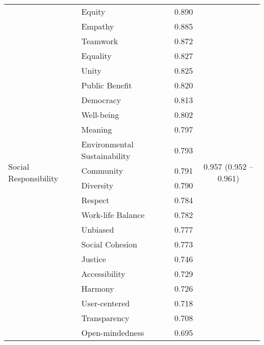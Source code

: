 \begin{longtable}{llcc}
        \multirow{43}{*}{Social Responsibility}
                                  & Equity                  & 0.890 & \multirow{43}{*}{0.957 (0.952 -- 0.961)} \\
                                  & Empathy                 & 0.885 & \\
                                  & Teamwork                & 0.872 & \\
                                  & Equality                & 0.827 & \\
                                  & Unity                   & 0.825 & \\
                                  & Public Benefit          & 0.820 & \\
                                  & Democracy               & 0.813 & \\
                                  & Well-being              & 0.802 & \\
                                  & Meaning                 & 0.797 & \\
                                  & Environmental Sustainability & 0.793 & \\
                                  & Community               & 0.791 & \\
                                  & Diversity               & 0.790 & \\
                                  & Respect                 & 0.784 & \\
                                  & Work-life Balance       & 0.782 & \\
                                  & Unbiased                & 0.777 & \\
                                  & Social Cohesion         & 0.773 & \\
                                  & Justice                 & 0.746 & \\
                                  & Accessibility           & 0.729 & \\
                                  & Harmony                 & 0.726 & \\
                                  & User-centered           & 0.718 & \\
                                  & Transparency            & 0.708 & \\
                                  & Open-mindedness         & 0.695 & \\

\end{longtable}
